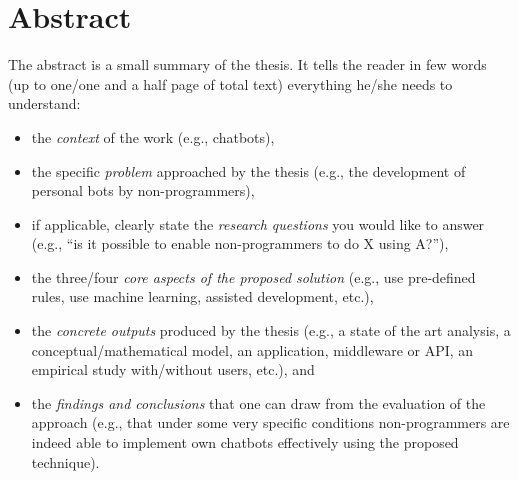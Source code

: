
\newpage
\chapter*{Abstract}


The abstract is a small summary of the thesis. It tells the reader in few words (up to one/one and a half page of total text) everything he/she needs to understand: 

\begin{itemize}
\item[\Square] the \emph{context} of the work (e.g., chatbots),
\item[\Square] the specific \emph{problem} approached by the thesis (e.g., the development of personal bots by non-programmers), 
\item[\Square] if applicable, clearly state the \emph{research questions} you would like to answer (e.g., ``is it possible to enable non-programmers to do X using A?''),
\item[\Square] the three/four \emph{core aspects of the proposed solution} (e.g., use pre-defined rules, use machine learning, assisted development, etc.), 
\item[\Square] the \emph{concrete outputs} produced by the thesis (e.g., a state of the art analysis, a conceptual/mathematical model, an application, middleware or API, an empirical study with/without users, etc.), and 
\item[\Square] the \emph{findings and conclusions} that one can draw from the evaluation of the approach (e.g., that under some very specific conditions non-programmers are indeed able to implement own chatbots effectively using the proposed technique).
\end{itemize}




